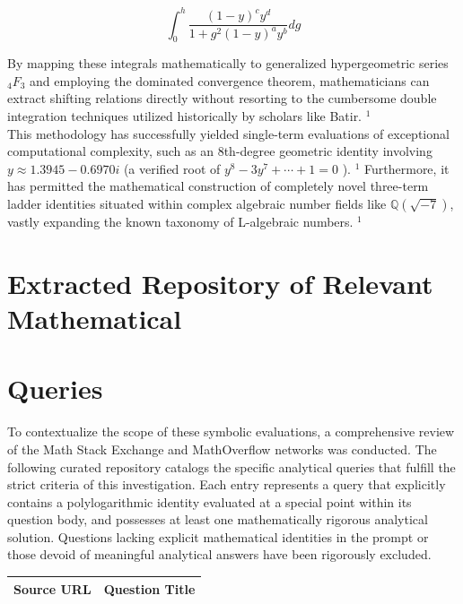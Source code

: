 \documentclass[10pt]{article}
\begin{document}
$$
\int_{0}^{h} \frac{(1-y)^{c} y^{d}}{1+g^{2}(1-y)^{a} y^{b}} d g
$$

By mapping these integrals mathematically to generalized hypergeometric series ${ }_{4} F_{3}$ and employing the dominated convergence theorem, mathematicians can extract shifting relations directly without resorting to the cumbersome double integration techniques utilized historically by scholars like Batir. ${ }^{1}$\\
This methodology has successfully yielded single-term evaluations of exceptional computational complexity, such as an 8th-degree geometric identity involving $y \approx 1.3945-0.6970 i$ (a verified root of $y^{8}-3 y^{7}+\cdots+1=0$ ). ${ }^{1}$ Furthermore, it has permitted the mathematical construction of completely novel three-term ladder identities situated within complex algebraic number fields like $\mathbb{Q}(\sqrt{-7})$, vastly expanding the known taxonomy of L-algebraic numbers. ${ }^{1}$

\section*{Extracted Repository of Relevant Mathematical}
\section*{Queries}
To contextualize the scope of these symbolic evaluations, a comprehensive review of the Math Stack Exchange and MathOverflow networks was conducted. The following curated repository catalogs the specific analytical queries that fulfill the strict criteria of this investigation. Each entry represents a query that explicitly contains a polylogarithmic identity evaluated at a special point within its question body, and possesses at least one mathematically rigorous analytical solution. Questions lacking explicit mathematical identities in the prompt or those devoid of meaningful analytical answers have been rigorously excluded.

\begin{center}
\begin{tabular}{|l|l|}
\hline
Source URL & Question Title \\
\hline
\end{tabular}
\end{center}
\end{document}
